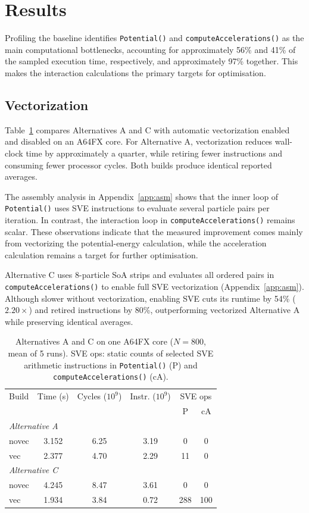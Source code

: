 \documentclass[conference]{IEEEtran}
\begin{document}
\section{Results}
Profiling the baseline identifies \texttt{Potential()} and
\texttt{computeAccelerations()} as the main computational bottlenecks,
accounting for approximately 56\% and 41\% of the sampled execution
time, respectively, and approximately 97\% together.
This makes the interaction calculations the primary targets for optimisation.

\subsection{Vectorization}
Table~\ref{tab:vec} compares Alternatives A and C with automatic vectorization
enabled and disabled on an A64FX core. For Alternative A, vectorization reduces
wall-clock time by approximately a quarter, while retiring fewer instructions and
consuming fewer processor cycles. Both builds produce identical
reported averages.

The assembly analysis in Appendix~\ref{app:asm} shows that the inner
loop of \texttt{Potential()} uses SVE instructions to evaluate
several particle pairs per iteration. In contrast, the interaction loop
in \texttt{computeAccelerations()} remains scalar. These observations
indicate that the measured improvement comes mainly from vectorizing
the potential-energy calculation, while the acceleration calculation
remains a target for further optimisation.

Alternative C uses 8-particle SoA strips and evaluates all ordered pairs in
\texttt{computeAccelerations()} to enable full SVE vectorization
(Appendix~\ref{app:asm}). Although slower without vectorization, enabling
SVE cuts its runtime by 54\% ($2.20\times$) and retired instructions by
80\%, outperforming vectorized Alternative A while preserving identical
averages.

\begin{table}[htbp]
\caption{Alternatives A and C on one A64FX core ($N=800$, mean of 5 runs).
SVE ops: static counts of selected SVE arithmetic instructions in \texttt{Potential()} (P) and
\texttt{computeAccelerations()} (cA).}
\label{tab:vec}
\centering
\begin{tabular}{lccccc}
\hline
Build & Time (s) & Cycles ($10^9$) & Instr. ($10^9$) & \multicolumn{2}{c}{SVE ops} \\
      &          &                 &                 & P & cA \\
\hline
\multicolumn{6}{l}{\textit{Alternative A}} \\
novec & 3.152 & 6.25 & 3.19 & 0   & 0   \\
vec   & 2.377 & 4.70 & 2.29 & 11  & 0   \\
\hline
\multicolumn{6}{l}{\textit{Alternative C}} \\
novec & 4.245 & 8.47 & 3.61 & 0   & 0   \\
vec   & 1.934 & 3.84 & 0.72 & 288 & 100 \\
\hline
\end{tabular}
\end{table}
\end{document}
